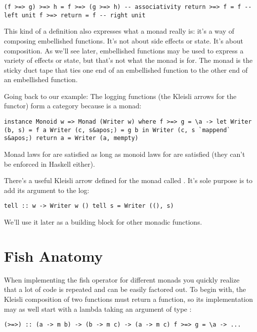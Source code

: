 \begin{verbatim}
(f >=> g) >=> h = f >=> (g >=> h) -- associativity return >=> f = f -- left unit f >=> return = f -- right unit
\end{verbatim}

This kind of a definition also expresses what a monad really is: it's a
way of composing embellished functions. It's not about side effects or
state. It's about composition. As we'll see later, embellished functions
may be used to express a variety of effects or state, but that's not
what the monad is for. The monad is the sticky duct tape that ties one
end of an embellished function to the other end of an embellished
function.

Going back to our  example: The logging functions (the
Kleisli arrows for the  functor) form a category because
 is a monad:

\begin{verbatim}
instance Monoid w => Monad (Writer w) where f >=> g = \a -> let Writer (b, s) = f a Writer (c, s&apos;) = g b in Writer (c, s `mappend` s&apos;) return a = Writer (a, mempty)
\end{verbatim}

Monad laws for  are satisfied as long as monoid laws
for  are satisfied (they can't be enforced in Haskell either).

There's a useful Kleisli arrow defined for the  monad
called . It's sole purpose is to add its argument to the
log:

\begin{verbatim}
tell :: w -> Writer w () tell s = Writer ((), s)
\end{verbatim}

We'll use it later as a building block for other monadic functions.

\section{Fish Anatomy}\label{fish-anatomy}

When implementing the fish operator for different monads you quickly
realize that a lot of code is repeated and can be easily factored out.
To begin with, the Kleisli composition of two functions must return a
function, so its implementation may as well start with a lambda taking
an argument of type :

\begin{verbatim}
(>=>) :: (a -> m b) -> (b -> m c) -> (a -> m c) f >=> g = \a -> ...
\end{verbatim}

